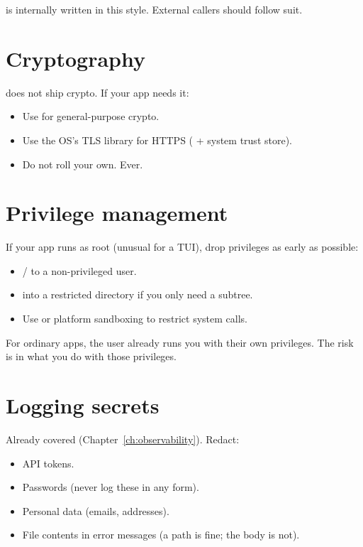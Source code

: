 \maya{} is internally written in this style. External callers
should follow suit.

\section{Cryptography}

\maya{} does not ship crypto. If your app needs it:

\begin{itemize}[leftmargin=*]
  \item Use  for general-purpose crypto.
  \item Use the OS's TLS library for HTTPS (
    + system trust store).
  \item Do not roll your own. Ever.
\end{itemize}

\section{Privilege management}

If your app runs as root (unusual for a TUI), drop privileges
as early as possible:

\begin{itemize}[leftmargin=*]
  \item {}/ to a non-privileged user.
  \item {} into a restricted directory if you only
    need a subtree.
  \item Use  or platform sandboxing to restrict
    system calls.
\end{itemize}

For ordinary apps, the user already runs you with their own
privileges. The risk is in what you do with those privileges.

\section{Logging secrets}

Already covered (Chapter~\ref{ch:observability}). Redact:

\begin{itemize}[leftmargin=*]
  \item API tokens.
  \item Passwords (never log these in any form).
  \item Personal data (emails, addresses).
  \item File contents in error messages (a path is fine; the
    body is not).
\end{itemize}


